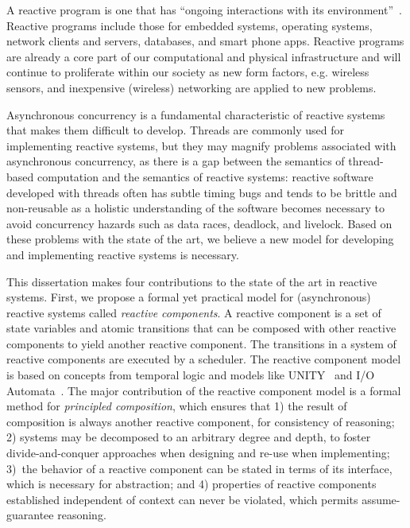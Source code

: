 A reactive program is one that has ``ongoing interactions with its environment''~\cite{manna1992temporal}.
Reactive programs include those for embedded systems, operating systems, network clients and servers, databases, and smart phone apps.
Reactive programs are already a core part of our computational and physical infrastructure and will continue to proliferate within our society as new form factors, e.g. wireless sensors, and inexpensive (wireless) networking are applied to new problems.

Asynchronous concurrency is a fundamental characteristic of reactive systems that makes them difficult to develop.
Threads are commonly used for implementing reactive systems, but they may magnify problems associated with asynchronous concurrency, as there is a gap between the semantics of thread-based computation and the semantics of reactive systems:  reactive software developed with threads often has subtle timing bugs and tends to be brittle and non-reusable as a holistic understanding of the software becomes necessary to avoid concurrency hazards such as data races, deadlock, and livelock.
Based on these problems with the state of the art, we believe a new model for developing and implementing reactive systems is necessary.

This dissertation makes four contributions to the state of the art in reactive systems.
First, we propose a formal yet practical model for (asynchronous) reactive systems called \emph{reactive components}.
A reactive component is a set of state variables and atomic transitions that can be composed with other reactive components to yield another reactive component.
The transitions in a system of reactive components are executed by a scheduler.
The reactive component model is based on concepts from temporal logic and models like UNITY~\cite{chandy1989parallel} and I/O Automata~\cite{nancy1996distributed}.
The major contribution of the reactive component model is a formal method for \emph{principled composition}, which ensures that 1) the result of composition is always another reactive component, for consistency of reasoning; 2) systems may be decomposed to an arbitrary degree and depth, to foster divide-and-conquer approaches when designing and re-use when implementing; 3)~the behavior of a reactive component can be stated in terms of its interface, which is necessary for abstraction; and 4) properties of reactive components established independent of context can never be violated, which permits assume-guarantee reasoning.

